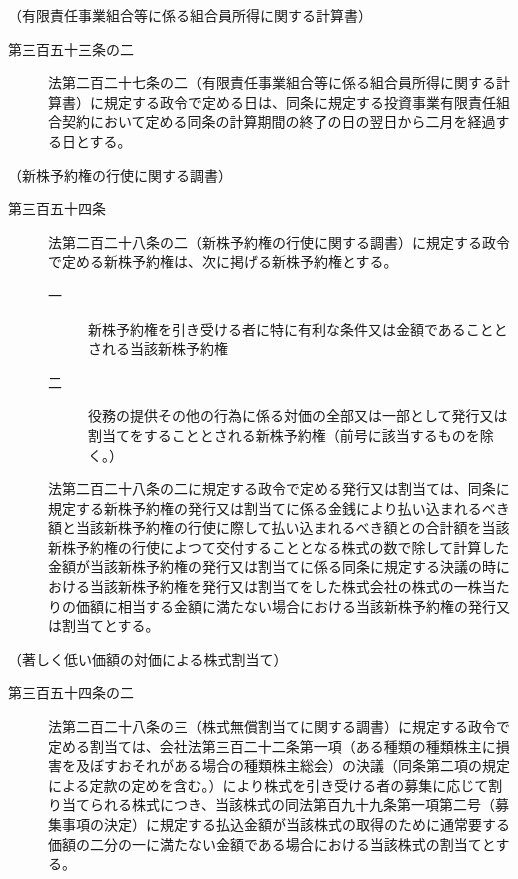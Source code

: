 \documentclass[twocolumn,a4j,10pt]{ltjtarticle}
\begin{document}
\noindent\hspace{10pt}（有限責任事業組合等に係る組合員所得に関する計算書）
\begin{description}
\item[第三百五十三条の二]法第二百二十七条の二（有限責任事業組合等に係る組合員所得に関する計算書）に規定する政令で定める日は、同条に規定する投資事業有限責任組合契約において定める同条の計算期間の終了の日の翌日から二月を経過する日とする。
\end{description}
\noindent\hspace{10pt}（新株予約権の行使に関する調書）
\begin{description}
\item[第三百五十四条]法第二百二十八条の二（新株予約権の行使に関する調書）に規定する政令で定める新株予約権は、次に掲げる新株予約権とする。
\begin{description}
\item[一]新株予約権を引き受ける者に特に有利な条件又は金額であることとされる当該新株予約権
\item[二]役務の提供その他の行為に係る対価の全部又は一部として発行又は割当てをすることとされる新株予約権（前号に該当するものを除く。）
\end{description}
\item[]法第二百二十八条の二に規定する政令で定める発行又は割当ては、同条に規定する新株予約権の発行又は割当てに係る金銭により払い込まれるべき額と当該新株予約権の行使に際して払い込まれるべき額との合計額を当該新株予約権の行使によつて交付することとなる株式の数で除して計算した金額が当該新株予約権の発行又は割当てに係る同条に規定する決議の時における当該新株予約権を発行又は割当てをした株式会社の株式の一株当たりの価額に相当する金額に満たない場合における当該新株予約権の発行又は割当てとする。
\end{description}
\noindent\hspace{10pt}（著しく低い価額の対価による株式割当て）
\begin{description}
\item[第三百五十四条の二]法第二百二十八条の三（株式無償割当てに関する調書）に規定する政令で定める割当ては、会社法第三百二十二条第一項（ある種類の種類株主に損害を及ぼすおそれがある場合の種類株主総会）の決議（同条第二項の規定による定款の定めを含む。）により株式を引き受ける者の募集に応じて割り当てられる株式につき、当該株式の同法第百九十九条第一項第二号（募集事項の決定）に規定する払込金額が当該株式の取得のために通常要する価額の二分の一に満たない金額である場合における当該株式の割当てとする。
\end{description}
\end{document}
